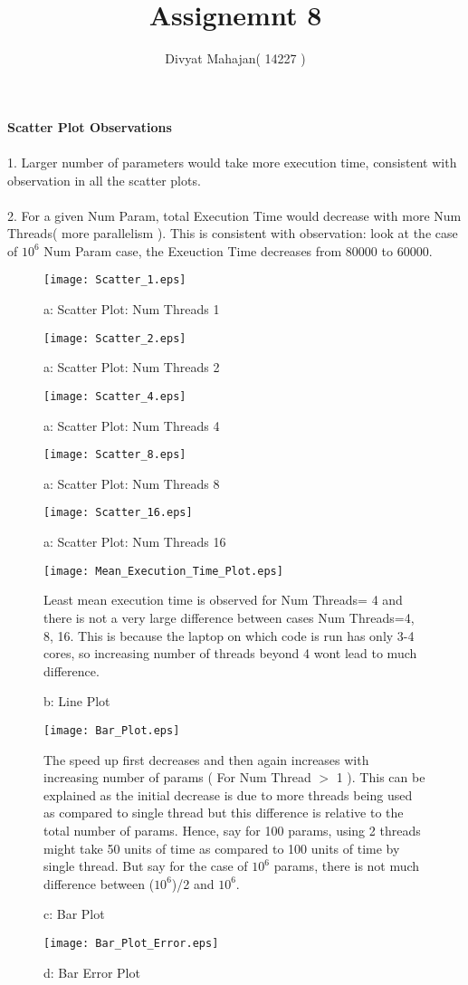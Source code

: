 \documentclass{article}
\title{ Assignemnt 8 }
\author{ Divyat Mahajan( 14227 ) }
\begin{document}
\maketitle

\textbf{Scatter Plot Observations}\\ \\
1. Larger number of parameters would take more execution time, consistent with observation in all the scatter plots.\\ \\
2. For a given Num Param, total Execution Time would decrease with more Num Threads( more parallelism ). This is consistent with observation: look at the case of $10^6$ Num Param case, the Exeuction Time decreases from 80000 to 60000.

\begin{figure}
		\texttt{[image: Scatter\_1.eps]}
		\caption{a: Scatter Plot: Num Threads 1}
\end{figure}

\begin{figure}
		\texttt{[image: Scatter\_2.eps]}
		\caption{a: Scatter Plot: Num Threads 2}
\end{figure}

\begin{figure}
		\texttt{[image: Scatter\_4.eps]}
		\caption{a: Scatter Plot: Num Threads 4}
\end{figure}

\begin{figure}
		\texttt{[image: Scatter\_8.eps]}
		\caption{a: Scatter Plot: Num Threads 8}
\end{figure}

\begin{figure}
		\texttt{[image: Scatter\_16.eps]}
		\caption{a: Scatter Plot: Num Threads 16}
\end{figure}


\begin{figure}
		\texttt{[image: Mean\_Execution\_Time\_Plot.eps]}
		\caption{b: Line Plot}
		\bigbreak
		Least mean execution time is observed for Num Threads= 4 and there is not a very large difference between cases Num Threads=4, 8, 16. 
		This is because the laptop on which code is run has only 3-4 cores, so increasing number of threads beyond 4 wont lead to much difference.
\end{figure}

\begin{figure}
		\texttt{[image: Bar\_Plot.eps]}
		\caption{c: Bar Plot }
		\bigbreak
		The speed up first decreases and then again increases with increasing number of params ( For Num Thread $>$ 1 ). This can be explained as the initial decrease is due to more threads being used as compared to single thread but this difference is relative to the total number of params. Hence, say for 100 params, using 2 threads might take 50 units of time as compared to 100 units of time by single thread. But say for the case of $10^6$ params, there is not much difference between ($10^6$)/2 and $10^6$.
\end{figure}

\begin{figure}
		\texttt{[image: Bar\_Plot\_Error.eps]}
		\caption{d: Bar Error Plot}
\end{figure}
\end{document}

